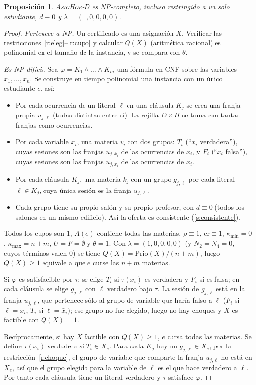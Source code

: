 \documentclass[11pt,letterpaper]{article}
\theoremstyle{definition}
\theoremstyle{remark}
\theoremstyle{plain}
\newtheorem{proposicion}{Proposición}
\begin{document}
\begin{proposicion}\label{prop:np}
\textup{\textsc{AsigHor-D}} es NP-completo, incluso restringido a un solo
estudiante, $d\equiv0$ y $\lambda=(1,0,0,0,0)$.
\end{proposicion}
\begin{proof}
\emph{Pertenece a NP.} Un certificado es una asignación $X$. Verificar las
restricciones~\ref{r:eleg}--\ref{r:cupo} y calcular $Q(X)$ (aritmética
racional) es polinomial en el tamaño de la instancia, y se compara con
$\theta$.

\emph{Es NP-difícil.} Sea $\varphi=K_1\wedge\dots\wedge K_m$ una fórmula en
CNF sobre las variables $x_1,\dots,x_n$. Se construye en tiempo polinomial
una instancia con un único estudiante $e$, así:
\begin{itemize}[nosep]
  \item Por cada ocurrencia de un literal $\ell$ en una cláusula $K_j$ se crea
        una franja propia $u_{j,\ell}$ (todas distintas entre sí). La rejilla
        $D\times H$ se toma con tantas franjas como ocurrencias.
  \item Por cada variable $x_i$, una materia $v_i$ con dos grupos:
        $T_i$ (``$x_i$ verdadera''), cuyas sesiones son las franjas
        $u_{j,\bar x_i}$ de las ocurrencias de $\bar x_i$, y
        $F_i$ (``$x_i$ falsa''), cuyas sesiones son las franjas
        $u_{j,x_i}$ de las ocurrencias de $x_i$.
  \item Por cada cláusula $K_j$, una materia $k_j$ con un grupo $g_{j,\ell}$ por
        cada literal $\ell\in K_j$, cuya única sesión es la franja $u_{j,\ell}$.
  \item Cada grupo tiene su propio salón y su propio profesor, con
        $d\equiv0$ (todos los salones en un mismo edificio). Así la oferta es
        consistente (\ref{s:consistente}).
\end{itemize}
Todos los cupos son $1$, $A(e)$ contiene todas las materias, $\rho\equiv1$,
$\mathrm{cr}\equiv1$, $\kappa_{\min}=0$, $\kappa_{\max}=n+m$, $U=F=\emptyset$ y
$\theta=1$. Con $\lambda=(1,0,0,0,0)$ (y $N_2=N_4=0$, cuyos términos valen
$0$) se tiene $Q(X)=\mathrm{Prio}(X)/(n+m)$, luego $Q(X)\ge 1$ equivale a que
$e$ curse las $n+m$ materias.

Si $\varphi$ es satisfacible por $\tau$: se elige $T_i$ si $\tau(x_i)$ es
verdadera y $F_i$ si es falsa; en cada cláusula se elige $g_{j,\ell}$ con
$\ell$ verdadero bajo $\tau$. La sesión de $g_{j,\ell}$ está en la franja
$u_{j,\ell}$, que pertenece sólo al grupo de variable que haría falso a
$\ell$ ($F_i$ si $\ell=x_i$, $T_i$ si $\ell=\bar x_i$); ese grupo no fue
elegido, luego no hay choques y $X$ es factible con $Q(X)=1$.

Recíprocamente, si hay $X$ factible con $Q(X)\ge1$, $e$ cursa todas las
materias. Se define $\tau(x_i)$ verdadera si $T_i\in X_e$. Para cada $K_j$ hay
un $g_{j,\ell}\in X_e$; por la restricción~\ref{r:choque}, el grupo de variable
que comparte la franja $u_{j,\ell}$ no está en $X_e$, así que el grupo elegido
para la variable de $\ell$ es el que hace verdadero a $\ell$. Por tanto cada
cláusula tiene un literal verdadero y $\tau$ satisface $\varphi$.
\end{proof}
\end{document}
